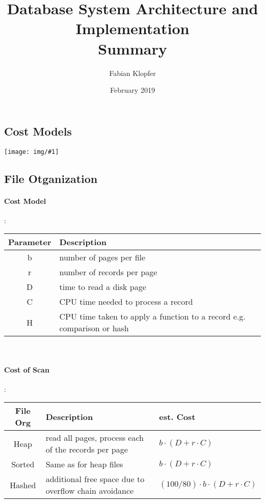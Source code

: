 \documentclass[a4paper]{article}
\title{Database System Architecture and Implementation \\
	Summary}
\author{Fabian Klopfer}
\date{February 2019}
\newcommand{\img}[1]{\begin{center}
		\texttt{[image: img/\#1]}
\end{center} }
\begin{document}
	
	\begin{twocolumn}
\section{Cost Models}
\img{cardinality_assumption}

\subsection{File Otganization}
\paragraph{Cost Model}: \\
\begin{tabular}{|c|p{6cm}|} \hline
	Parameter & Description \\ \hline
	b & number of pages per file \\ \hline
	r & number of records per page \\ \hline
	D & time to read a disk page \\ \hline
	C & CPU time needed to process a record \\ \hline
	H & CPU time taken to apply a function to a record e.g. comparison or hash \\ \hline
\end{tabular} \\

\paragraph{Cost of Scan} : \\
\begin{tabular}{|c|p{3cm}|p{3cm}|} \hline
	File Org & Description & est. Cost \\ \hline
	Heap & read all pages, process each of the records per page & $b \cdot (D + r \cdot C)$ \\ \hline
	Sorted & Same as for heap files & $b \cdot (D + r \cdot C)$ \\ \hline
	Hashed & additional free space due to overflow chain avoidance & $ (100/80) \cdot b \cdot (D + r \cdot C)$ \\ \hline
\end{tabular} \\



\end{twocolumn}
\end{document}
